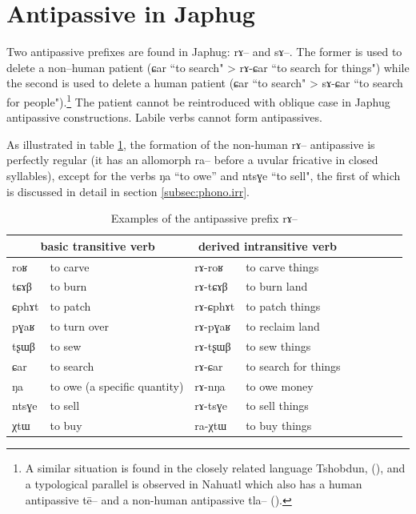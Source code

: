 \documentclass[oldfontcommands,oneside,a4paper,11pt]{article}
\newcommand{\ipa}[1]{{\phon \mbox{#1}}} %
\begin{document}
\section{Antipassive in Japhug} \label{sec:antipassive}
Two antipassive prefixes are found in Japhug: \ipa{rɤ}-- and \ipa{sɤ}--.  The former is used to delete a non--human patient (\ipa{ɕar} ``to search" > \ipa{rɤ-ɕar} ``to search for things") while the second is used to delete a human patient (\ipa{ɕar} ``to search" > \ipa{sɤ-ɕar} ``to search for people").\footnote{A similar situation is found in the closely related language Tshobdun, (\citealt[8]{jackson06paisheng}), and a typological parallel is observed in Nahuatl which also has a human antipassive \ipa{tē}-- and a non-human antipassive \ipa{tla}-- (\citealt[91]{creissels06sgit2}).}  The patient cannot be reintroduced with oblique case in Japhug antipassive constructions. Labile verbs cannot form antipassives.

As illustrated in table \ref{tab:antipassive.jpg}, the formation of the non-human \ipa{rɤ}-- antipassive is perfectly regular (it has an allomorph \ipa{ra}-- before a uvular fricative in closed syllables), except for the verbs \ipa{ŋa} ``to owe'' and \ipa{ntsɣe} ``to sell",   the first of which is discussed in detail  in section \ref{subsec:phono.irr}. %

\begin{table}[H]
\caption{Examples of the antipassive prefix  \ipa{rɤ}--} \label{tab:antipassive.jpg}
\begin{tabular}{lllllllll} \toprule
\multicolumn{2}{c}{basic  transitive verb}  & \multicolumn{2}{c}{derived  intransitive verb}  \\
\midrule
\ipa{roʁ}   &	to carve &  	\ipa{rɤ-roʁ}   &	to carve things \\  
\ipa{tɕɤβ}   &	to burn &  	\ipa{rɤ-tɕɤβ}   &	to burn land \\  
\ipa{ɕphɤt}   &	to patch &  	\ipa{rɤ-ɕphɤt}   &	to patch things \\  
\ipa{pɣaʁ}   &	to turn over &  	\ipa{rɤ-pɣaʁ}   &	to reclaim land \\  
\ipa{tʂɯβ}   &	to sew &  	\ipa{rɤ-tʂɯβ}   &	 to sew things \\   
\ipa{ɕar}   &	to search &  	\ipa{rɤ-ɕar}   &	to search for things \\ 
\ipa{ŋa}   &	to owe  (a specific quantity)&  	\ipa{rɤ-nŋa}   &	to owe money \\  
\ipa{ntsɣe}   &	to sell &  	\ipa{rɤ-tsɣe}   &	to sell things \\  
\ipa{χtɯ}   &	to buy &  	\ipa{ra-χtɯ}   &	to buy things \\  
\bottomrule
\end{tabular}
\end{table}
\end{document}
